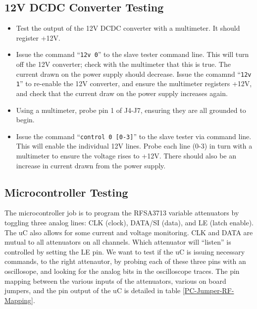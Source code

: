 \documentclass[letter,12pt]{article}
\begin{document}
\subsection{12V DCDC Converter Testing}
\begin{itemize}
\item Test the output of the 12V DCDC converter with a multimeter. It should register +12V.
\item Issue the command ``\texttt{12v 0}'' to the slave tester command line. This will turn off the 12V converter; check with the multimeter that this is true. The current drawn on the power supply should decrease. Issue the comamnd ``\texttt{12v 1}'' to re-enable the 12V converter, and ensure the multimeter registers +12V, and check that the current draw on the power supply increases again.
\item Using a multimeter, probe pin 1 of J4-J7, ensuring they are all grounded to begin.
\item Issue the command ``\texttt{control 0 [0-3]}'' to the slave tester via command line. This will enable the individual 12V lines. Probe each line (0-3) in turn with a multimeter to ensure the voltage rises to +12V. There should also be an increase in current drawn from the power supply.
\end{itemize}

\subsection{Microcontroller Testing \label{subsec:Microcontroller-Testing}}

The microcontroller job is to program the RFSA3713 variable attenuators by toggling three analog lines: CLK (clock), DATA/SI (data), and LE (latch enable). The uC also allows for some current and voltage monitoring. CLK and DATA are mutual to all attenuators on all channels. Which attenuator will ``listen'' is controlled by setting the LE pin. We want to test if the uC is issuing necessary commands, to the right attenautor, by probing each of these three pins with an oscillosope, and looking for the analog bits in the oscilloscope traces. The pin mapping between the various inputs of the attenuators, various on board jumpers, and the pin output of the uC is detailed in table \ref{PC-Jumper-RF-Mapping}.
\end{document}

